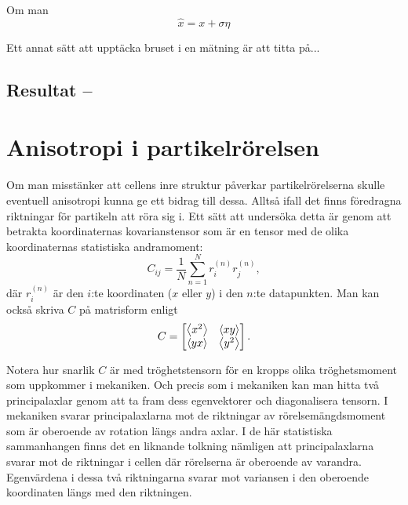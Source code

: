 Om man 
\begin{equation}
\hat{x} = x + \sigma\eta
\end{equation}



Ett annat sätt att upptäcka bruset i en mätning är att titta på...


\subsection{Resultat -- }



\section{Anisotropi i partikelrörelsen}
Om man misstänker att cellens inre struktur påverkar partikelrörelserna skulle eventuell anisotropi kunna ge ett bidrag till dessa. Alltså ifall det finns föredragna riktningar för partikeln att röra sig i. Ett sätt att undersöka detta är genom att betrakta koordinaternas kovarianstensor som är en tensor med de olika koordinaternas statistiska andramoment:
\begin{equation}
C_{ij} = \frac{1}{N} \sum_{n=1}^{N} r_i^{(n)}r_j^{(n)},
\end{equation}
där $r_i^{(n)}$ är den $i$:te koordinaten ($x$ eller $y$) i den $n$:te datapunkten. Man kan också skriva $C$ på matrisform enligt
\begin{equation}
C=
\begin{bmatrix} \label{eq:C_matrix}
\ev{x^2} & \ev{xy}\\
\ev{yx} & \ev{y^2}
\end{bmatrix}.
\end{equation}

Notera hur snarlik $C$ är med tröghetstensorn för en kropps olika tröghetsmoment som uppkommer i mekaniken. Och precis som i mekaniken kan man hitta två principalaxlar genom att ta fram dess egenvektorer och diagonalisera tensorn. I mekaniken svarar principalaxlarna mot de riktningar av rörelsemängdsmoment som är oberoende av rotation längs andra axlar. I de här statistiska sammanhangen finns det en liknande tolkning nämligen att principalaxlarna svarar mot de riktningar i cellen där rörelserna är oberoende av varandra. Egenvärdena i dessa två riktningarna svarar mot variansen i den oberoende koordinaten längs med den riktningen.

